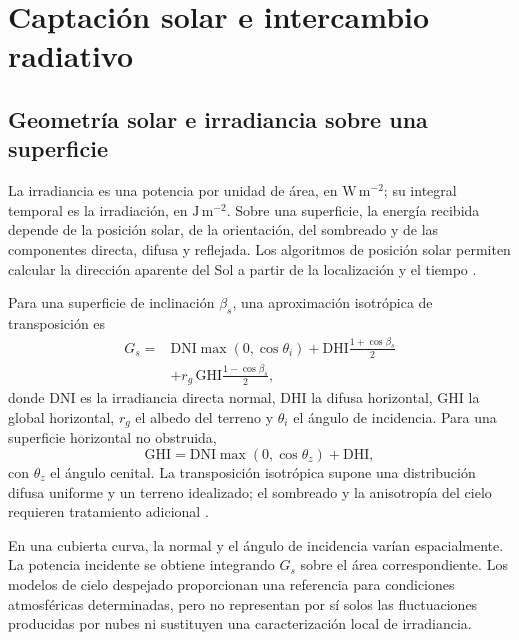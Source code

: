 \section{Captación solar e intercambio radiativo}
\label{sec:radiacion_solar}

\subsection{Geometría solar e irradiancia sobre una superficie}

La irradiancia es una potencia por unidad de área, en $\mathrm{W\,m^{-2}}$; su integral temporal es la irradiación, en $\mathrm{J\,m^{-2}}$. Sobre una superficie, la energía recibida depende de la posición solar, de la orientación, del sombreado y de las componentes directa, difusa y reflejada. Los algoritmos de posición solar permiten calcular la dirección aparente del Sol a partir de la localización y el tiempo \cite{reda2004}.

Para una superficie de inclinación $\beta_s$, una aproximación isotrópica de transposición es
\begin{equation}
\begin{aligned}
G_s={}&\mathrm{DNI}\max(0,\cos\theta_i)
+\mathrm{DHI}\frac{1+\cos\beta_s}{2}\\
&+r_g\,\mathrm{GHI}\frac{1-\cos\beta_s}{2},
\end{aligned}
\label{eq:globalirradiance}
\end{equation}
donde DNI es la irradiancia directa normal, DHI la difusa horizontal, GHI la global horizontal, $r_g$ el albedo del terreno y $\theta_i$ el ángulo de incidencia. Para una superficie horizontal no obstruida,
\begin{equation}
\mathrm{GHI}=\mathrm{DNI}\max(0,\cos\theta_z)+\mathrm{DHI},
\label{eq:ghi}
\end{equation}
con $\theta_z$ el ángulo cenital. La transposición isotrópica supone una distribución difusa uniforme y un terreno idealizado; el sombreado y la anisotropía del cielo requieren tratamiento adicional \cite{duffie2013}.

En una cubierta curva, la normal y el ángulo de incidencia varían espacialmente. La potencia incidente se obtiene integrando $G_s$ sobre el área correspondiente. Los modelos de cielo despejado proporcionan una referencia para condiciones atmosféricas determinadas, pero no representan por sí solos las fluctuaciones producidas por nubes ni sustituyen una caracterización local de irradiancia.

